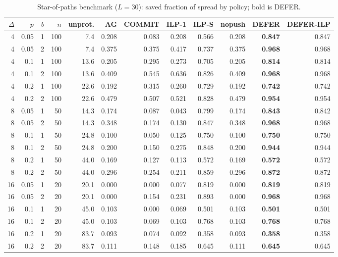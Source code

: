 \documentclass[preprint,11pt]{elsarticle}
\theoremstyle{definition}
\theoremstyle{remark}
\begin{document}
\begin{table}[h]
\centering
\caption{Star-of-paths benchmark ($L=30$): saved fraction of spread by policy; bold is DEFER.\label{tab:sop}}
\footnotesize
\begin{tabular}{rrrrrrrrrrrr}
\hline
$\Delta$ & $p$ & $b$ & $n$ & unprot. & AG & COMMIT & ILP-1 & ILP-S & nopush & DEFER & DEFER-ILP \\
\hline
4 & 0.05 & 1 & 100 & 7.4 & 0.208 & 0.083 & 0.208 & 0.566 & 0.208 & \textbf{0.847} & 0.847 \\
4 & 0.05 & 2 & 100 & 7.4 & 0.375 & 0.375 & 0.417 & 0.737 & 0.375 & \textbf{0.968} & 0.968 \\
4 & 0.1 & 1 & 100 & 13.6 & 0.205 & 0.295 & 0.273 & 0.705 & 0.205 & \textbf{0.814} & 0.814 \\
4 & 0.1 & 2 & 100 & 13.6 & 0.409 & 0.545 & 0.636 & 0.826 & 0.409 & \textbf{0.968} & 0.968 \\
4 & 0.2 & 1 & 100 & 22.6 & 0.192 & 0.315 & 0.260 & 0.729 & 0.192 & \textbf{0.742} & 0.742 \\
4 & 0.2 & 2 & 100 & 22.6 & 0.479 & 0.507 & 0.521 & 0.828 & 0.479 & \textbf{0.954} & 0.954 \\
8 & 0.05 & 1 & 50 & 14.3 & 0.174 & 0.087 & 0.043 & 0.799 & 0.174 & \textbf{0.843} & 0.842 \\
8 & 0.05 & 2 & 50 & 14.3 & 0.348 & 0.174 & 0.130 & 0.847 & 0.348 & \textbf{0.968} & 0.968 \\
8 & 0.1 & 1 & 50 & 24.8 & 0.100 & 0.050 & 0.125 & 0.750 & 0.100 & \textbf{0.750} & 0.750 \\
8 & 0.1 & 2 & 50 & 24.8 & 0.200 & 0.150 & 0.275 & 0.848 & 0.200 & \textbf{0.944} & 0.944 \\
8 & 0.2 & 1 & 50 & 44.0 & 0.169 & 0.127 & 0.113 & 0.572 & 0.169 & \textbf{0.572} & 0.572 \\
8 & 0.2 & 2 & 50 & 44.0 & 0.296 & 0.254 & 0.211 & 0.859 & 0.296 & \textbf{0.872} & 0.872 \\
16 & 0.05 & 1 & 20 & 20.1 & 0.000 & 0.000 & 0.077 & 0.819 & 0.000 & \textbf{0.819} & 0.819 \\
16 & 0.05 & 2 & 20 & 20.1 & 0.000 & 0.154 & 0.231 & 0.893 & 0.000 & \textbf{0.968} & 0.968 \\
16 & 0.1 & 1 & 20 & 45.0 & 0.103 & 0.000 & 0.069 & 0.501 & 0.103 & \textbf{0.501} & 0.501 \\
16 & 0.1 & 2 & 20 & 45.0 & 0.103 & 0.069 & 0.103 & 0.768 & 0.103 & \textbf{0.768} & 0.768 \\
16 & 0.2 & 1 & 20 & 83.7 & 0.093 & 0.074 & 0.092 & 0.358 & 0.093 & \textbf{0.358} & 0.358 \\
16 & 0.2 & 2 & 20 & 83.7 & 0.111 & 0.148 & 0.185 & 0.645 & 0.111 & \textbf{0.645} & 0.645 \\
\hline
\end{tabular}
\end{table}
\end{document}
